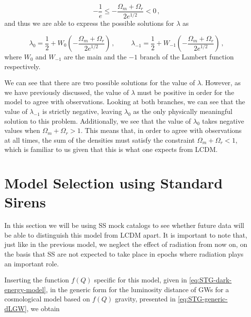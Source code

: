 \begin{equation}
    -\frac{1}{e} \leq - \frac{\Omega_m + \Omega_r}{2e^{1/2}} < 0 \,,
\end{equation}
and thus we are able to express the possible solutions for $\lambda$ as

\begin{equation}
    \lambda_0 = \frac{1}{2} + W_0\left( -\frac{\Omega_m + \Omega_r}{2e^{1/2}} \right)
    \,, \hspace{1cm}
    \lambda_{-1} = \frac{1}{2} + W_{-1}\left( -\frac{\Omega_m + \Omega_r}{2e^{1/2}} \right)
    \,,
\end{equation}
where $W_0$ and $W_{-1}$ are the main and the $-1$ branch of the Lambert function respectively.

We can see that there are two possible solutions for the value of $\lambda$. However, as we have previously discussed, the value of $\lambda$ must be positive in order for the model to agree with observations. Looking at both branches, we can see that the value of $\lambda_{-1}$ is strictly negative, leaving $\lambda_0$ as the only physically meaningful solution to this problem. Additionally, we see that the value of $\lambda_0$ takes negative values when $\Omega_m + \Omega_r > 1$. This means that, in order to agree with observations at all times, the sum of the densities must satisfy the constraint $\Omega_m + \Omega_r < 1$, which is familiar to us given that this is what one expects from \gls{LCDM}.


\section{Model Selection using Standard Sirens}
\label{sec:fQ-dark-energy-forecasts}

In this section we will be using \gls{SS} mock catalogs to see whether future data will be able to distinguish this model from \gls{LCDM} apart. It is important to note that, just like in the previous model, we neglect the effect of radiation from now on, on the basis that \gls{SS} are not expected to take place in epochs where radiation plays an important role.

Inserting the function $f(Q)$ specific for this model, given in \cref{eq:STG-dark-energy-model}, in the generic form for the luminosity distance of \glspl{GW} for a cosmological model based on $f(Q)$ gravity, presented in \cref{eq:STG-generic-dLGW}, we obtain

